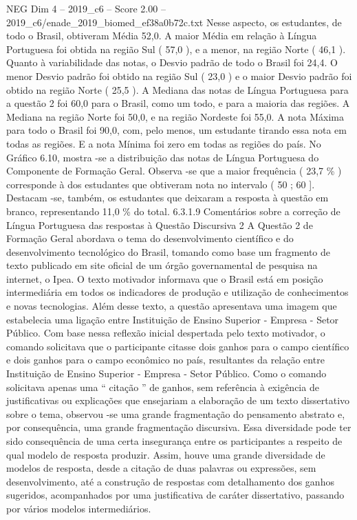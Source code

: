 \begin{textsample}{NEG Dim 4 – 2019\_c6 – Score 2.00 – 2019\_c6/enade\_2019\_biomed\_ef38a0b72c.txt}
Nesse aspecto, os estudantes, de todo o Brasil, obtiveram Média 52,0.
A maior Média em relação à Língua Portuguesa foi obtida na região Sul ( 57,0 ), e a menor, na região Norte ( 46,1 ).
Quanto à variabilidade das notas, o Desvio padrão de todo o Brasil foi 24,4.
O menor Desvio padrão foi obtido na região Sul ( 23,0 ) e o maior Desvio padrão foi obtido na região Norte ( 25,5 ).
A Mediana das notas de Língua Portuguesa para a questão 2 foi 60,0 para o Brasil, como um todo, e para a maioria das regiões.
A Mediana na região Norte foi 50,0, e na região Nordeste foi 55,0.
A nota Máxima para todo o Brasil foi 90,0, com, pelo menos, um estudante tirando essa nota em todas as regiões.
E a nota Mínima foi zero em todas as regiões do país.
No Gráfico 6.10, mostra -se a distribuição das notas de Língua Portuguesa do Componente de Formação Geral.
Observa -se que a maior frequência ( 23,7 \% ) corresponde à dos estudantes que obtiveram nota no intervalo ( 50 ; 60 ].
Destacam -se, também, os estudantes que deixaram a resposta à questão em branco, representando 11,0 \% do total. 6.3.1.9 Comentários sobre a correção de Língua Portuguesa das respostas à Questão Discursiva 2 A Questão 2 de Formação Geral abordava o tema do desenvolvimento científico e do desenvolvimento tecnológico do Brasil, tomando como base um fragmento de texto publicado em site oficial de um órgão governamental de pesquisa na internet, o Ipea.
O texto motivador informava que o Brasil está em posição intermediária em todos os indicadores de produção e utilização de conhecimentos e novas tecnologias.
Além desse texto, a questão apresentava uma imagem que estabelecia uma ligação entre Instituição de Ensino Superior - Empresa - Setor Público.
Com base nessa reflexão inicial despertada pelo texto motivador, o comando solicitava que o participante citasse dois ganhos para o campo científico e dois ganhos para o campo econômico no país, resultantes da relação entre Instituição de Ensino Superior - Empresa - Setor Público.
Como o comando solicitava apenas uma “ citação ” de ganhos, sem referência à exigência de justificativas ou explicações que ensejariam a elaboração de um texto dissertativo sobre o tema, observou -se uma grande fragmentação do pensamento abstrato e, por consequência, uma grande fragmentação discursiva.
Essa diversidade pode ter sido consequência de uma certa insegurança entre os participantes a respeito de qual modelo de resposta produzir.
Assim, houve uma grande diversidade de modelos de resposta, desde a citação de duas palavras ou expressões, sem desenvolvimento, até a construção de respostas com detalhamento dos ganhos sugeridos, acompanhados por uma justificativa de caráter dissertativo, passando por vários modelos intermediários.

\end{textsample}
